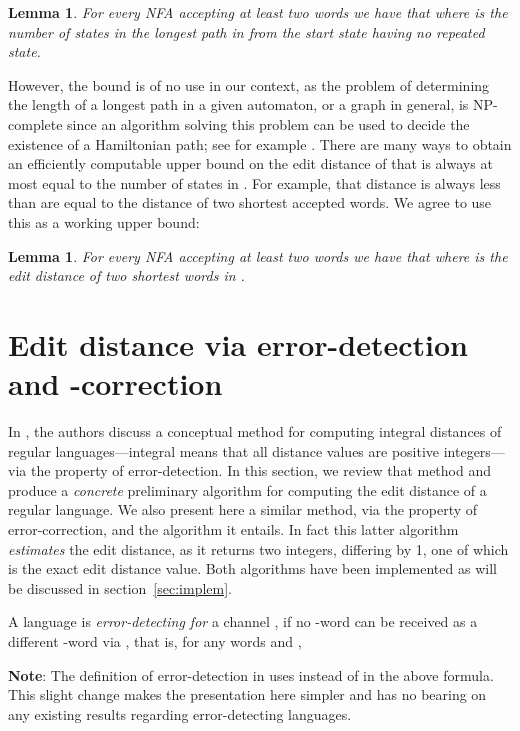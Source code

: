 \documentclass{article}
\theoremstyle{plain}
\newtheorem{lemma}[theorem]{Lemma}
\theoremstyle{definition}
\theoremstyle{remark}
\begin{document}
\begin{lemma}
For every NFA  accepting at least two words
we have that 
where  is the number of states in the
longest path in  from the start state having no repeated state.
\end{lemma}

However, the bound  is of no use in our context,
as the problem of determining the length of a longest path in a given automaton, or a graph in general, is NP-complete since an algorithm solving this problem can be used to decide the existence of a Hamiltonian path; see for example \cite{Schr:2003}.
There are many ways to obtain an efficiently computable
upper bound on the edit distance of  that is always
at most equal to the number of states in .
For example, that distance is always less than are equal
to the distance of  two shortest accepted words.
We agree to use this as a working upper bound:


\begin{lemma}\label{lem:bound}
For every NFA  accepting at least two words
we have that 
where  is the edit distance of two
shortest words in .
\end{lemma}


\section{Edit distance via error-detection and -correction}\label{sec:ed}
In \cite{KonSil:2010}, the authors discuss a
conceptual method for computing integral distances of regular languages---integral means that all distance values are positive integers---via
the property of error-detection.
In this section, we review that method and produce
a \emph{concrete} preliminary algorithm for computing
the edit distance of a regular language.
We also present here a similar method, via the property of error-correction, and the algorithm it entails. In fact this
latter algorithm \emph{estimates} the edit distance, as it returns two integers, differing by 1, one of which is the exact edit distance value.
Both algorithms have been implemented as
will be discussed
in section~\ref{sec:implem}.

A language  is \emph{error-detecting for} a channel , if no -word can be received as a different -word via , that is,
for any words  and ,

\textbf{Note}: The definition of error-detection in
\cite{Kon:2002} uses  instead of 
in the above formula. This slight change makes the
presentation here simpler and has no bearing on any
existing results regarding error-detecting languages.
\end{document}
